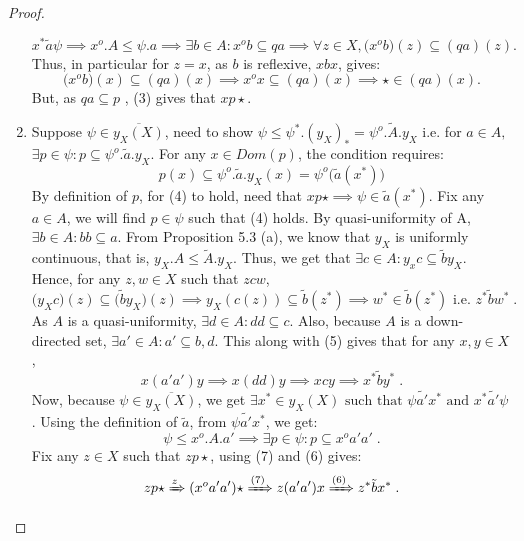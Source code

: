 \documentclass[a4paper]{article}
\theoremstyle{definition}
\begin{document}
\begin{proof}
\begin{enumerate}[label=(\alph*)]
				\begin{equation} x^* \tilde{a} \psi \implies x^o.A \leq \psi.a
					\implies \exists b\in A: x^ob \subseteq qa
					\implies \forall z \in X, \big(x^o b \big)(z) \subseteq (qa)(z)
				.\end{equation}
				Thus, in particular for $z=x$, as $b$ is reflexive, $xbx$, gives:
				\begin{equation} \big(x^o b \big)(x) \subseteq (qa)(x) \implies x^ox \subseteq (qa)(x) \implies \star \in (qa)(x). \end{equation}
				But, as $qa \subseteq p$ , (3) gives that $xp\star$.
			\item Suppose $\psi \in \overline{y_X(X)}$, need to show $\psi \leq \psi^*.(y_X)_*=\psi^o.\tilde{A}.y_X$ i.e.
				for $a \in A,$ $\exists p \in \psi: p \subseteq \psi^o.\tilde{a}.y_X$. For any $x \in Dom(p)$,
				the condition requires:
				\begin{equation}
					p(x) \subseteq  \psi^o.\tilde{a} .y_X(x)=\psi^o\big(\tilde{a} (x^*)\big)
				\end{equation}
				By definition of $p$, for (4) to hold, need that $xp\star \implies \psi \in \tilde{a}(x^*) $. Fix
				any $a\in A$, we will find $p \in \psi$ such that (4) holds.
				By quasi-uniformity of A,
				$\exists b \in A: bb \subseteq a$. From Proposition 5.3 (a),
				we know that $y_X$ is uniformly continuous, that is,
				$y_X.A \leq \tilde{A}.y_X $. Thus, we get that $\exists c \in A: y_xc \subseteq \tilde{b}y_X $. Hence, for any $z,w\in X$ such that $z c w$,
				\begin{equation} \big(y_X c \big)(z) \subseteq \big(\tilde{b} y_X\big)(z) \implies
					y_X(c(z)) \subseteq \tilde{b}(z^*) \implies w^* \in \tilde{b}(z^*) \text{ i.e. } z^* \tilde{b} w^*\;.
				\end{equation}
				As $A$ is a quasi-uniformity, $\exists d\in A: dd \subseteq c$. Also, because $A$ is a down-
				directed set, $\exists a' \in A: a' \subseteq b,d $. This along with (5) gives that
				for any $x,y \in X$,
				\begin{equation} x(a'a')y \implies x(dd)y \implies xcy \implies x^* \tilde{b} y^* \; .\end{equation}
				Now, because $\psi \in \overline{y_X(X)}$, we get
				$\exists x^* \in y_X(X) \text{ such that } \psi \tilde{a'}x^* \text{ and } x^* \tilde{a'} \psi $.
				Using the definition of $\tilde{a}$, from $\psi \tilde{a'}x^*$,
				we get:
				\begin{equation} \psi \leq x^o.A.a' \implies \exists p \in \psi: p \subseteq x^o a'a' \; .\end{equation}
				Fix any $z \in X$ such that $zp \star$, using (7) and (6) gives:
				\begin{equation} zp \star \xRightarrow z(x^o a'a') \star \xRightarrow{(7)} z(a'a')x
				\xRightarrow{(6)} z^* \tilde{b}x^*  \; . \end{equation}


\end{enumerate}
\end{proof}
\end{document}
